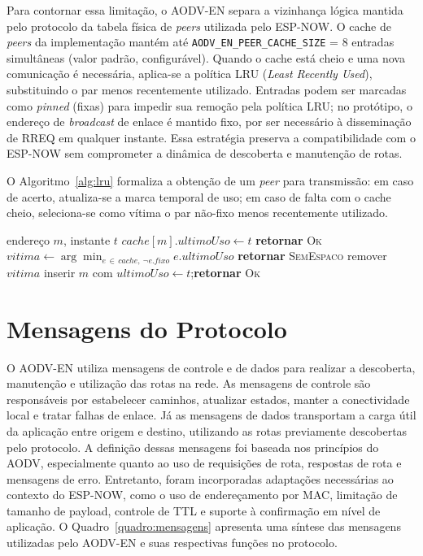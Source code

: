 Para contornar essa limitação, o AODV-EN separa a vizinhança lógica
mantida pelo protocolo da tabela física de \emph{peers} utilizada pelo
ESP-NOW. O cache de \emph{peers} da implementação mantém até
\texttt{AODV\_EN\_PEER\_CACHE\_SIZE} = 8 entradas simultâneas (valor
padrão, configurável). Quando o cache está cheio e uma nova comunicação
é necessária, aplica-se a política LRU (\emph{Least Recently Used}),
substituindo o par menos recentemente utilizado. Entradas podem ser
marcadas como \emph{pinned} (fixas) para impedir sua remoção pela
política LRU; no protótipo, o endereço de \emph{broadcast} de enlace é
mantido fixo, por ser necessário à disseminação de RREQ em qualquer
instante. Essa estratégia preserva a compatibilidade com o ESP-NOW sem
comprometer a dinâmica de descoberta e manutenção de rotas.

O Algoritmo~\ref{alg:lru} formaliza a obtenção de um \emph{peer} para
transmissão: em caso de acerto, atualiza-se a marca temporal de uso; em
caso de falta com o cache cheio, seleciona-se como vítima o par não-fixo
menos recentemente utilizado.

\begin{algorithm}[H]
\caption{Obtenção de \emph{peer} com substituição LRU}\label{alg:lru}
\begin{algorithmic}[1]
\Require endereço $m$, instante $t$
  \State $\mathit{cache}[m].\mathit{ultimoUso} \gets t$ 
  \State \textbf{retornar} \textsc{Ok}
\EndIf
{}
  \State $\mathit{vitima} \gets \arg\min_{e\,\in\,\mathit{cache},\ \neg e.\mathit{fixo}} e.\mathit{ultimoUso}$
  \quad \textbf{retornar} \textsc{SemEspaco}\quad\EndIf
  \State remover $\mathit{vitima}$
\EndIf
\State inserir $m$ com $\mathit{ultimoUso} \gets t$;\quad \textbf{retornar} \textsc{Ok}
\end{algorithmic}
\end{algorithm}

\section{Mensagens do Protocolo}\label{mensagens-do-protocolo}

O AODV-EN utiliza mensagens de controle e de dados para realizar a
descoberta, manutenção e utilização das rotas na rede. As mensagens de
controle são responsáveis por estabelecer caminhos, atualizar estados,
manter a conectividade local e tratar falhas de enlace. Já as mensagens
de dados transportam a carga útil da aplicação entre origem e destino,
utilizando as rotas previamente descobertas pelo protocolo. A definição
dessas mensagens foi baseada nos princípios do AODV, especialmente
quanto ao uso de requisições de rota, respostas de rota e mensagens de
erro. Entretanto, foram incorporadas adaptações necessárias ao contexto
do ESP-NOW, como o uso de endereçamento por MAC, limitação de tamanho de
payload, controle de TTL e suporte à confirmação em nível de aplicação.
O Quadro~\ref{quadro:mensagens} apresenta uma síntese das mensagens utilizadas pelo AODV-EN
e suas respectivas funções no protocolo.

